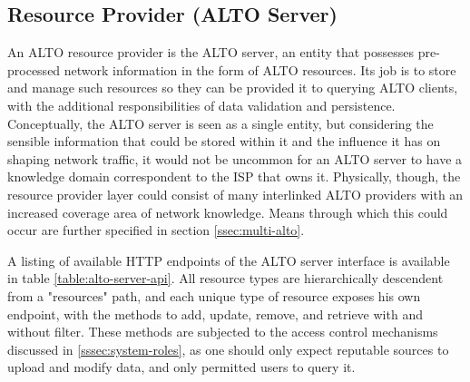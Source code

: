 
\subsection{Resource Provider (ALTO Server)}

    An ALTO resource provider is the ALTO server, an entity that possesses pre-processed network information in the form of ALTO resources.
    Its job is to store and manage such resources so they can be provided it to querying ALTO clients, with the additional responsibilities of data validation and persistence.
    Conceptually, the ALTO server is seen as a single entity, but considering the sensible information that could be stored within it and the influence it has on shaping network traffic, it would not be uncommon for an ALTO server to have a knowledge domain correspondent to the ISP that owns it.
    Physically, though, the resource provider layer could consist of many interlinked ALTO providers with an increased coverage area of network knowledge.
    Means through which this could occur are further specified in section \ref{ssec:multi-alto}.

    A listing of available HTTP endpoints of the ALTO server interface is available in table \ref{table:alto-server-api}.
    All resource types are hierarchically descendent from a "resources" path, and each unique type of resource exposes his own endpoint, with the methods to add, update, remove, and retrieve with and without filter.
    These methods are subjected to the access control mechanisms discussed in \ref{sssec:system-roles}, as one should only expect reputable sources to upload and modify data, and only permitted users to query it.

